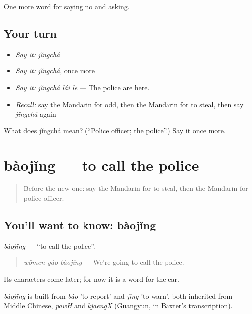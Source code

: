 \begin{grammarlens}[title={What you've built}]
One more word for saying no and asking.
\end{grammarlens}

\subsection*{Your turn}
\begin{itemize}
\raggedright
  \item \emph{Say it:} \emph{jǐngchá}
  \item \emph{Say it:} \emph{jǐngchá}, once more
  \item \emph{Say it:} \emph{jǐngchá lái le} — The police are here.
  \item \emph{Recall:} say the Mandarin for odd, then the Mandarin for to steal, then say \emph{jǐngchá} again
\end{itemize}

\begin{tcolorbox}[breakable,colback=teal!4,colframe=teal!35!black,title={Before you move on}]
What does jǐngchá mean? (\textquotedblleft{}Police officer; the police\textquotedblright{}.) Say it once more.
\end{tcolorbox}
\section[bàojǐng]{bàojǐng — to call the police}

\label{lesson:ZH-C216-baojing}



\begin{quote}
Before the new one: say the Mandarin for to steal, then the Mandarin for police officer.
\end{quote}

\subsection*{You'll want to know: bàojǐng}
\emph{bàojǐng} — \textquotedblleft{}to call the police\textquotedblright{}.

\begin{quote}
\emph{wǒmen yào bàojǐng} — We're going to call the police.
\end{quote}

Its characters come later; for now it is a word for the ear.

\begin{cousinweb}
\emph{bàojǐng} is built from \emph{bào} 'to report' and \emph{jǐng} 'to warn', both inherited from Middle Chinese, \emph{pawH} and \emph{kjaengX} (Guangyun, in Baxter's transcription).
\end{cousinweb}

